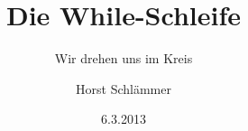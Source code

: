 \documentclass[
  showresults,
]{edu}
\author{Horst Schlämmer}
\date{6.3.2013}
\subtitle{Wir drehen uns im Kreis}
\title{Die While-Schleife}
\begin{document}
  \begin{preview}
    \begin{minipage}{\linewidth}
      
    \end{minipage}
  \end{preview}
  
\end{document}
